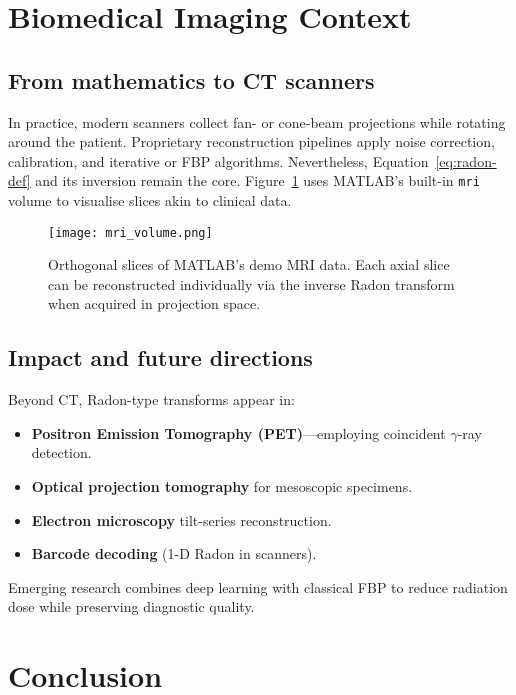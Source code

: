 \documentclass[11pt]{article}
\begin{document}
\section{Biomedical Imaging Context}

\subsection{From mathematics to CT scanners}

In practice, modern scanners collect fan- or cone-beam projections while
rotating around the patient.  Proprietary reconstruction pipelines apply
noise correction, calibration, and iterative or FBP algorithms.
Nevertheless, Equation~\eqref{eq:radon-def} and its inversion remain the
core.  Figure~\ref{fig:mri} uses MATLAB’s built-in \texttt{mri} volume
to visualise slices akin to clinical data.

\begin{figure}[h]
\centering
\texttt{[image: mri\_volume.png]}
\caption{Orthogonal slices of MATLAB’s demo MRI data.  Each axial slice
can be reconstructed individually via the inverse Radon transform when
acquired in projection space.\label{fig:mri}}
\end{figure}

\subsection{Impact and future directions}

Beyond CT, Radon-type transforms appear in:
\begin{itemize}\itemsep0.2em
\item \textbf{Positron Emission Tomography (PET)}---employing coincident
      $\gamma$-ray detection.
\item \textbf{Optical projection tomography} for mesoscopic specimens.
\item \textbf{Electron microscopy} tilt-series reconstruction.
\item \textbf{Barcode decoding} (1-D Radon in scanners).
\end{itemize}

Emerging research combines deep learning with classical FBP to reduce
radiation dose while preserving diagnostic quality.

\section{Conclusion}
\end{document}
